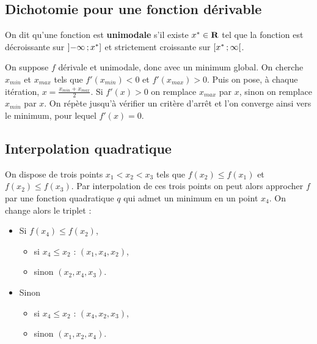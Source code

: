 \subsection{Dichotomie pour une fonction dérivable}

	\begin{defn}
		On dit qu'une fonction est \textbf{unimodale} s'il existe $x^* \in \mathbf{R}$ tel que la fonction est décroissante sur $\mathopen{}\mathclose{\left]-\infty\mathclose{}\mathpunct{};x^*\right]}$ et strictement croissante sur $\mathopen{}\mathclose{\left[x^*\mathclose{}\mathpunct{};\infty\right[}$.
	\end{defn}

	On suppose $f$ dérivale et unimodale, donc avec un minimum global.
	On cherche $x_{min}$ et $x_{max}$ tels que $f'(x_{min}) < 0$ et $f'(x_{max}) > 0$.
	Puis on pose, à chaque itération, $x = \frac{x_{min} + x_{max}}{2}$.
	Si $f'(x) > 0$ on remplace $x_{max}$ par $x$, sinon on remplace $x_{min}$ par $x$.
	On répète jusqu'à vérifier un critère d'arrêt et l'on converge ainsi vers le minimum, pour lequel $f'(x) = 0$.


\subsection{Interpolation quadratique}

	On dispose de trois points $x_1 < x_2 < x_3$ tels que $f(x_2) \leq f(x_1)$ et $f(x_2) \leq f(x_3)$.
	Par interpolation de ces trois points on peut alors approcher $f$ par une fonction quadratique $q$ qui admet un minimum en un point $x_4$.
	On change alors le triplet :
	\begin{itemize}
		\item[\textbullet] Si $f(x_4) \leq f(x_2)$,
			\begin{itemize}
				\item si $x_4 \leq x_2$ : $(x_1,x_4,x_2)$,
				\item sinon $(x_2,x_4,x_3)$.
			\end{itemize}
		\item[\textbullet] Sinon
			\begin{itemize}
				\item si $x_4 \leq x_2$ : $(x_4,x_2,x_3)$,
				\item sinon $(x_1,x_2,x_4)$.
			\end{itemize}
	\end{itemize}